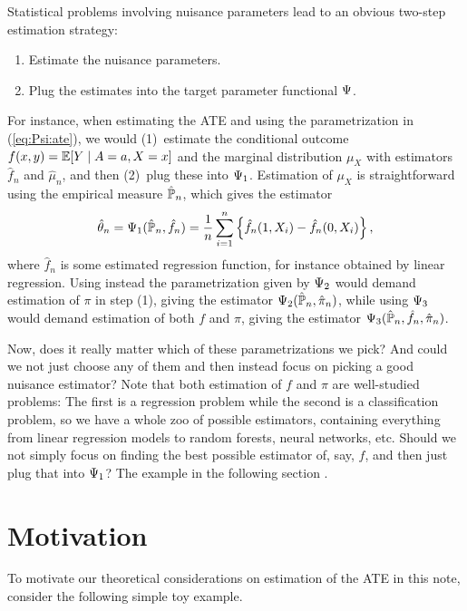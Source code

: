 \documentclass[a4,danish]{article}
\begin{document}
Statistical problems involving nuisance parameters lead to an obvious two-step estimation strategy:
\begin{enumerate}[label=(\arabic*), topsep=0pt]
\item Estimate the nuisance parameters.
\item Plug the estimates into the target parameter functional $\operatorname{\Psi}$.
\end{enumerate}
For instance, when estimating the ATE and using the parametrization in (\ref{eq:Psi:ate}), we would
(1)~estimate the conditional outcome $f(x,y) =\operatorname{\mathbb{E}}[Y \mid A=a, X=x]$ and the marginal distribution
$\mu_X$ with estimators $\hat{f}_n$ and $\hat{\mu}_n$, and then (2)~plug these into $\operatorname{\Psi}_1$.
Estimation of $\mu_X$ is straightforward using the empirical measure $\hat{\mathbb{P}}_n$, which gives the
estimator
\begin{equation}
  \label{eq:naiv-est}
  \hat{\theta}_n = \operatorname{\Psi}_1(\hat{\mathbb{P}}_n, \hat{f}_n) 
  = \frac{1}{n} \sum_{i=1}^{n} 
  \left\{
    \hat{f}_n(1, X_i) - \hat{f}_n(0, X_i)
  \right\},
\end{equation}
where $\hat{f}_n$ is some estimated regression function, for instance obtained by linear regression.
Using instead the parametrization given by $\operatorname{\Psi}_2$ would demand estimation of $\pi$ in step (1),
giving the estimator $\operatorname{\Psi}_2(\hat{\mathbb{P}}_n, \hat{\pi}_n) $, while using $\operatorname{\Psi}_3$ would demand estimation of
both $f$ and $\pi$, giving the estimator $\operatorname{\Psi}_3(\hat{\mathbb{P}}_n, \hat{f}_n, \hat{\pi}_n) $.

Now, does it really matter which of these parametrizations we pick? And could we not just choose any
of them and then instead focus on picking a good nuisance estimator? Note that both estimation of
$f$ and $\pi$ are well-studied problems: The first is a regression problem while the second is a
classification problem, so we have a whole zoo of possible estimators, containing everything from
linear regression models to random forests, neural networks, etc. Should we not simply focus on
finding the best possible estimator of, say, $f$, and then just plug that into $\operatorname{\Psi}_1$? The example
in the following section .

\section{Motivation}
\label{sec:motivation}


To motivate our theoretical considerations on estimation of the ATE in this note, consider the
following simple toy example.
\end{document}
